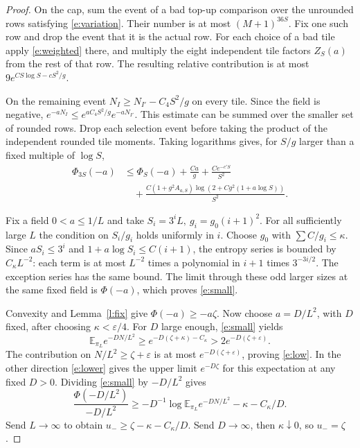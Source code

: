 \documentclass[11pt]{amsart}
\newcommand{\E}{\mathbb E}
\newcommand{\1}{\mathbf 1}
\begin{document}
\begin{proof}
On the cap, sum the event of a bad top-up comparison over the unrounded rows satisfying \eqref{e:variation}. Their number is at most \((M+1)^{36S}\). Fix one such row and drop the event that it is the actual row. For each choice of a bad tile apply \eqref{e:weighted} there, and multiply the eight independent tile factors \(Z_S(a)\) from the rest of that row. The resulting relative contribution is at most \(9e^{CS\log S-cS^2/g}\).

On the remaining event \(N_I\ge N_{I'}-C_4S^2/g\) on every tile. Since the field is negative, \(e^{-aN_I}\le e^{aC_4S^2/g}e^{-aN_{I'}}\). This estimate can be summed over the smaller set of rounded rows. Drop each selection event before taking the product of the independent rounded tile moments. Taking logarithms gives, for \(S/g\) larger than a fixed multiple of \(\log S\),
\begin{equation}\label{e:triple}
 \begin{aligned}
 \Phi_{3S}(-a)&\le\Phi_S(-a)+\frac{C a}{g}+\frac{Ce^{-c'S}}{S^2}\\
 &\quad+\frac{C(1+g^2 A_{a,S})\log(2+Cg^2(1+a\log S))}{S^2}.
 \end{aligned}
\end{equation}

Fix a field \(0<a\le1/L\) and take \(S_i=3^iL,\ g_i=g_0(i+1)^2\). For all sufficiently large \(L\) the condition on \(S_i/g_i\) holds uniformly in \(i\). Choose \(g_0\) with \(\sum C/g_i\le\kappa\). Since \(aS_i\le3^i\) and \(1+a\log S_i\le C(i+1)\), the entropy series is bounded by \(C_\kappa L^{-2}\): each term is at most \(L^{-2}\) times a polynomial in \(i+1\) times \(3^{-3i/2}\). The exception series has the same bound. The limit through these odd larger sizes at the same fixed field is \(\Phi(-a)\), which proves \eqref{e:small}.

Convexity and Lemma~\ref{l:fix} give \(\Phi(-a)\ge-a\zeta\). Now choose \(a=D/L^2\), with \(D\) fixed, after choosing \(\kappa<\varepsilon/4\). For \(D\) large enough, \eqref{e:small} yields
\[
 \E_{\pi_L} e^{-DN/L^2}\ge e^{-D(\zeta+\kappa)-C_\kappa}
       >2e^{-D(\zeta+\varepsilon)} .
\]
The contribution on \(N/L^2\ge\zeta+\varepsilon\) is at most \(e^{-D(\zeta+\varepsilon)}\), proving \eqref{e:low}. In the other direction \eqref{e:lower} gives the upper limit \(e^{-D\zeta}\) for this expectation at any fixed \(D>0\). Dividing \eqref{e:small} by \(-D/L^2\) gives
\[
 \frac{\Phi(-D/L^2)}{-D/L^2}
   \ge -D^{-1}\log \E_{\pi_L} e^{-DN/L^2}-\kappa-C_\kappa/D.
\]
Send \(L\to\infty\) to obtain \(u_-\ge\zeta-\kappa-C_\kappa/D\). Send \(D\to\infty\), then \(\kappa\downarrow0\), so \(u_-=\zeta\).


\end{proof}
\end{document}

